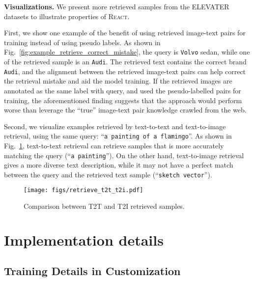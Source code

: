 \documentclass[10pt,twocolumn,letterpaper]{article}
\renewcommand{\paragraph}[1]{\vspace{1.25mm}\noindent\textbf{#1}}
\newcommand{\shortname}{\textsc{React}}
\begin{document}
\paragraph{Visualizations.}
We present more retrieved samples from the ELEVATER datasets to illustrate properties of \shortname{}.

First, we show one example of the benefit of using retrieved image-text pairs for training instead of using pseudo labels.  As shown in Fig.~\ref{fig:example_retrieve_correct_mistake}, the query is \texttt{Volvo} sedan, while one of the retrieved sample is an \texttt{Audi}.  The retrieved text contains the correct brand \texttt{Audi}, and the alignment between the retrieved image-text pairs can help correct the retrieval mistake and aid the model training. If the retrieved images are annotated as the same label with query, and used the pseudo-labelled pairs for training, the aforementioned finding suggests that the approach would perform worse than leverage the ``true'' image-text pair knowledge crawled from the web. 

Second, we visualize examples retrieved by text-to-text and text-to-image retrieval, using the same query: ``\texttt{a painting of a flamingo}''.  As shown in Fig.~\ref{fig:example_t2t_t2i_comp}, text-to-text retrieval can retrieve samples that is more accurately matching the query (``\texttt{a painting}''). On the other hand, text-to-image retrieval gives a more diverse text description, while it may not have a perfect match between the query and the retrieved text sample (``\texttt{sketch vector}'').

\begin{figure}[t]
	\centering
	\texttt{[image: figs/retrieve\_t2t\_t2i.pdf]}
    \caption{Comparison between T2T and T2I retrieved samples.}
    \label{fig:example_t2t_t2i_comp}
\end{figure}



\section{Implementation details}
\label{sec:implementation_details}

\subsection{Training Details in Customization}

\label{sec:details_customization}
\end{document}
